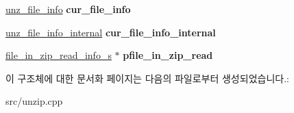 \begin{DoxyCompactItemize}
\mbox{\hyperlink{structunz__file__info__s}{unz\+\_\+file\+\_\+info}} {\bfseries cur\+\_\+file\+\_\+info}
\item 
\mbox{\label{structunz__s_a36625697385b9a675f02a446fa5ba583}} 
\mbox{\hyperlink{structunz__file__info__internal__s}{unz\+\_\+file\+\_\+info\+\_\+internal}} {\bfseries cur\+\_\+file\+\_\+info\+\_\+internal}
\item 
\mbox{\label{structunz__s_a7a5f0568475ad9a36ee2c1f3972406f0}} 
\mbox{\hyperlink{structfile__in__zip__read__info__s}{file\+\_\+in\+\_\+zip\+\_\+read\+\_\+info\+\_\+s}} $\ast$ {\bfseries pfile\+\_\+in\+\_\+zip\+\_\+read}
\end{DoxyCompactItemize}


이 구조체에 대한 문서화 페이지는 다음의 파일로부터 생성되었습니다.\+:\begin{DoxyCompactItemize}
\item 
src/unzip.\+cpp\end{DoxyCompactItemize}
